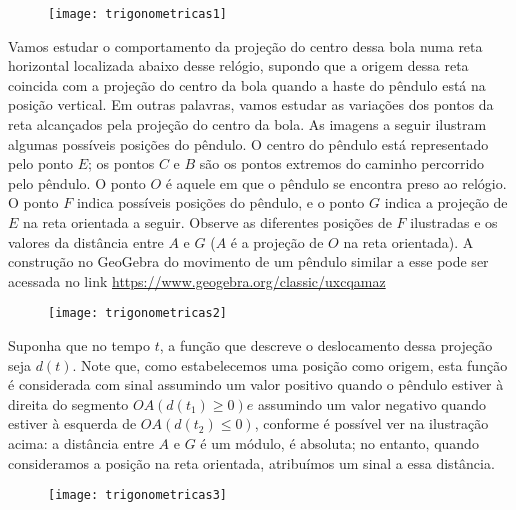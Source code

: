 \documentclass[10 pt,usenames,dvipsnames, oneside]{article}
\begin{document}
\begin{figure}[H]
\centering

\texttt{[image: trigonometricas1]}
\end{figure}

Vamos estudar o comportamento da projeção do centro dessa bola numa reta horizontal localizada abaixo desse relógio, supondo que a origem dessa reta coincida com a projeção do centro da bola quando a haste do pêndulo está na posição vertical. Em outras palavras, vamos estudar as variações dos pontos da reta alcançados pela projeção do centro da bola. As imagens a seguir ilustram algumas possíveis posições do pêndulo. O centro do pêndulo está representado pelo ponto $E$; os pontos $C$ e $B$ são os pontos extremos do caminho percorrido pelo pêndulo. O ponto $O$ é aquele em que o pêndulo se encontra preso ao relógio. O ponto $F$ indica possíveis posições do pêndulo, e o ponto $G$ indica a projeção de $E$ na reta orientada a seguir. Observe as diferentes posições de $F$ ilustradas e os valores da distância entre $A$ e $G$ ($A$ é a projeção de $O$ na reta orientada). A construção no GeoGebra do movimento de um pêndulo similar a esse pode ser acessada no link \url{https://www.geogebra.org/classic/uxcqamaz}


\begin{figure}[H]
\centering

\texttt{[image: trigonometricas2]}
\end{figure}

Suponha que no tempo $t$, a função que descreve o deslocamento dessa projeção seja $d(t)$. Note que, como estabelecemos uma posição como origem, esta função é considerada com sinal assumindo um valor positivo quando o pêndulo estiver à direita do segmento $OA(d(t_1)\geq0)e$ assumindo um valor negativo quando estiver à esquerda de $OA(d(t_2)\leq0)$, conforme é possível ver na ilustração acima: a distância entre $A$ e $G$ é um módulo, é absoluta; no entanto, quando consideramos a posição na reta orientada, atribuímos um sinal a essa distância.

\begin{figure}[H]
\centering

\texttt{[image: trigonometricas3]}
\end{figure}
\end{document}
